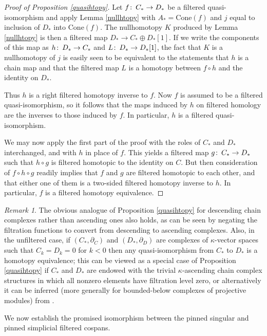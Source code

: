 \documentclass[11pt]{amsart}
\theoremstyle{definition}
\theoremstyle{remark}
\newtheorem{remark}[theorem]{Remark}
\numberwithin{equation}{section}
\def\co{\colon\thinspace}
\begin{document}
\begin{proof}[Proof of Proposition \ref{quasihtopy}]
	Let $f\co C_*\to D_*$ be a filtered quasi-isomorphism and apply Lemma \ref{nullhtopy} with $A_*=\mathrm{Cone}(f)$ and $j$ equal to inclusion of $D_*$ into $\mathrm{Cone}(f)$.  The nullhomotopy $K$ produced by Lemma \ref{nullhtopy} is then a filtered map $D_*\to C_{*}\oplus D_*[1]$.  If we write the components of this map as $h\co D_*\to C_*$ and $L\co D_*\to D_*[1]$, the fact that $K$ is a nullhomotopy of $j$ is easily seen to be equivalent to the statements that $h$ is a chain map and that the filtered map $L$ is a homotopy between $f\circ h$ and the identity on $D_*$.
	
	Thus $h$ is a right filtered homotopy inverse to $f$.  Now $f$ is assumed to be a filtered quasi-isomorphism, so it follows that the maps induced by $h$ on filtered homology are the inverses to those induced by $f$.  In particular, $h$ is a filtered quasi-isomorphism.
	
	We may now apply the first part of the proof with the roles of $C_*$ and $D_*$ interchanged, and with $h$ in place of $f$.  This yields a filtered map $g\co C_*\to D_*$ such that $h\circ g$ is filtered homotopic to the identity on $C$.  But then consideration of $f\circ h\circ g$ readily implies that $f$ and $g$ are filtered homotopic to each other, and that either one of them is a two-sided filtered homotopy inverse to $h$.  In particular, $f$ is a filtered homotopy equivalence.
\end{proof}

\begin{remark}\label{qhrmk}
	The obvious analogue of Proposition \ref{quasihtopy} for descending chain complexes rather than ascending ones also holds, as can be seen by negating the filtration functions to convert from descending to ascending complexes.  Also, in the unfiltered case, if $(C_*,\partial_C)$ and $(D_*,\partial_D)$ are complexes of $\kappa$-vector spaces such that $C_k=D_k=0$ for $k<0$ then any quasi-isomorphism from $C_*$ to $D_*$ is a homotopy equivalence; this can be viewed as a special case of Proposition \ref{quasihtopy} if $C_*$ and $D_*$ are endowed with the trivial $\kappa$-ascending chain complex structures in which all nonzero elements have filtration level zero, or alternatively it can be inferred (more generally for bounded-below complexes of projective modules) from \cite[Corollary 10.4.7]{Wei}.
\end{remark}

We now establish the promised isomorphism between the pinned singular and pinned simplicial filtered cospans.
\end{document}
